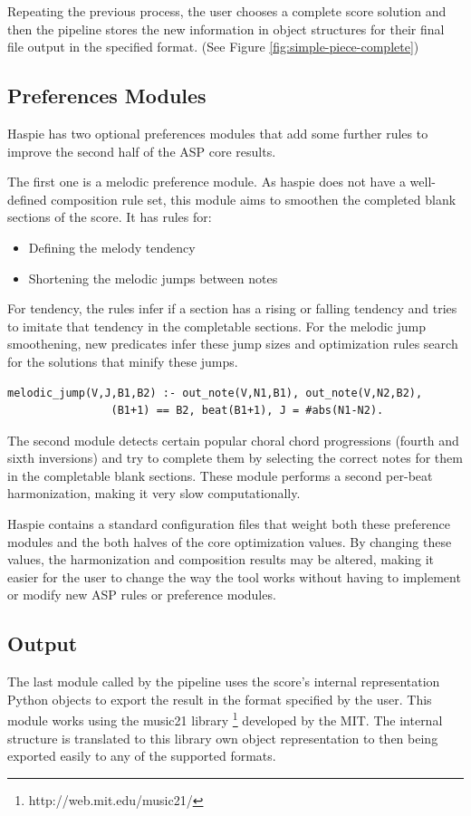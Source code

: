 Repeating the previous process, the user chooses a complete score solution and then the pipeline stores the new information in object structures for their final file output in the specified format. (See Figure \ref{fig:simple-piece-complete})

\subsection{Preferences Modules}
Haspie has two optional preferences modules that add some further rules to improve the second half of the ASP core results.

The first one is a melodic preference module. As haspie does not have a well-defined composition rule set, this module aims to smoothen the completed blank sections of the score. It has rules for:
\begin{itemize}
	\item Defining the melody tendency
	\item Shortening the melodic jumps between notes
\end{itemize}

For tendency, the rules infer if a section has a rising or falling tendency and tries to imitate that tendency in the completable sections. For the melodic jump smoothening, new predicates infer these jump sizes and optimization rules search for the solutions that minify these jumps.

\begin{Verbatim}[frame=single]
melodic_jump(V,J,B1,B2) :- out_note(V,N1,B1), out_note(V,N2,B2),
             	(B1+1) == B2, beat(B1+1), J = #abs(N1-N2). 
\end{Verbatim}

The second module detects certain popular choral chord progressions (fourth and sixth inversions) and try to complete them by selecting the correct notes for them in the completable blank sections. These module performs a second per-beat harmonization, making it very slow computationally.

Haspie contains a standard configuration files that weight both these preference modules and the both halves of the core optimization values. By changing these values, the harmonization and composition results may be altered, making it easier for the user to change the way the tool works without having to implement or modify new ASP rules or preference modules.

\subsection{Output}
The last module called by the pipeline uses the score's internal representation Python objects to export the result in the format specified by the user. This module works using the music21 library \footnote{http://web.mit.edu/music21/} developed by the MIT. The internal structure is translated to this library own object representation to then being exported easily to any of the supported formats.


